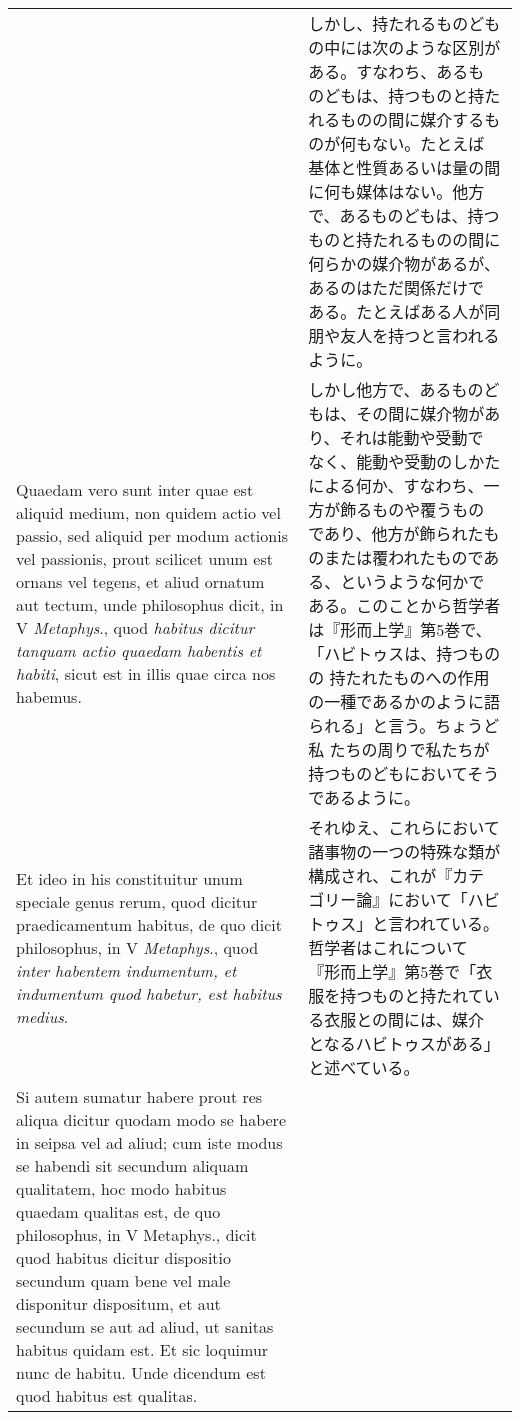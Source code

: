 \documentclass[10pt]{jsarticle} %
\begin{document}
\begin{longtable}{p{21em}p{21em}}
&

しかし、持たれるものどもの中には次のような区別がある。すなわち、あるも
のどもは、持つものと持たれるものの間に媒介するものが何もない。たとえば
基体と性質あるいは量の間に何も媒体はない。他方で、あるものどもは、持つ
ものと持たれるものの間に何らかの媒介物があるが、あるのはただ関係だけで
 ある。たとえばある人が同朋や友人を持つと言われるように。

\\


Quaedam vero sunt
inter quae est aliquid medium, non quidem actio vel passio, sed
aliquid per modum actionis vel passionis, prout scilicet unum est
ornans vel tegens, et aliud ornatum aut tectum, unde philosophus
dicit, in V {\itshape Metaphys}., quod {\itshape habitus dicitur tanquam actio quaedam
habentis et habiti}, sicut est in illis quae circa nos habemus. 

&

しかし他方で、あるものどもは、その間に媒介物があり、それは能動や受動で
なく、能動や受動のしかたによる何か、すなわち、一方が飾るものや覆うもの
であり、他方が飾られたものまたは覆われたものである、というような何かで
ある。このことから哲学者は『形而上学』第5巻で、「ハビトゥスは、持つものの
持たれたものへの作用の一種であるかのように語られる」と言う。ちょうど私
たちの周りで私たちが持つものどもにおいてそうであるように。


\\


Et ideo
in his constituitur unum speciale genus rerum, quod dicitur
praedicamentum habitus, de quo dicit philosophus, in V {\itshape Metaphys}., quod
{\itshape inter habentem indumentum, et indumentum quod habetur, est habitus
medius}. 

&


それゆえ、これらにおいて諸事物の一つの特殊な類が構成され、これが『カテ
ゴリー論』において「ハビトゥス」と言われている。哲学者はこれについて
『形而上学』第5巻で「衣服を持つものと持たれている衣服との間には、媒介
となるハビトゥスがある」と述べている。


\\



Si autem sumatur habere prout res aliqua dicitur quodam modo
se habere in seipsa vel ad aliud; cum iste modus se habendi sit
secundum aliquam qualitatem, hoc modo habitus quaedam qualitas est, de
quo philosophus, in V Metaphys., dicit quod habitus dicitur dispositio
secundum quam bene vel male disponitur dispositum, et aut secundum se
aut ad aliud, ut sanitas habitus quidam est. Et sic loquimur nunc de
habitu. Unde dicendum est quod habitus est qualitas.


\end{longtable}
\end{document}
